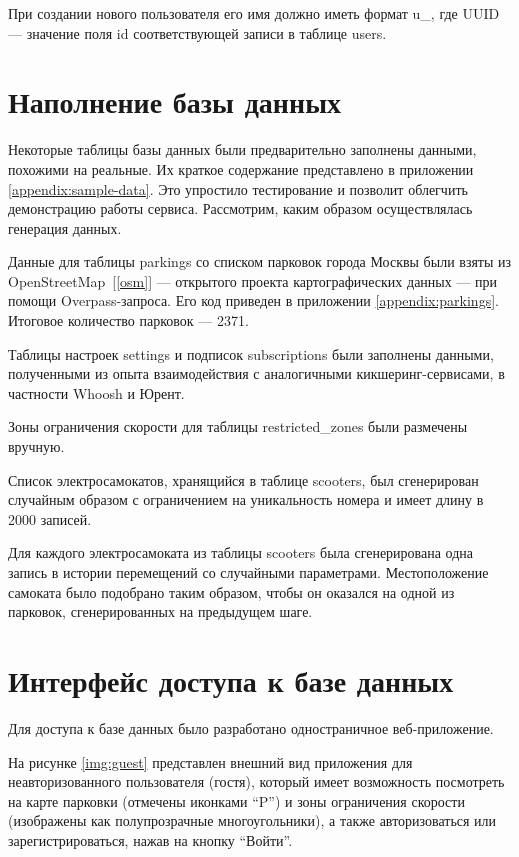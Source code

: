 При создании нового пользователя его имя должно иметь формат u\_<UUID без дефисов>, где UUID --- значение поля id соответствующей записи в таблице users.

\section{Наполнение базы данных}

Некоторые таблицы базы данных были предварительно заполнены данными, похожими на реальные. Их краткое содержание представлено в приложении \ref{appendix:sample-data}. Это упростило тестирование и позволит облегчить демонстрацию работы сервиса. Рассмотрим, каким образом осуществлялась генерация данных.

Данные для таблицы parkings со списком парковок города Москвы были взяты из OpenStreetMap~[\ref{osm}] --- открытого проекта картографических данных --- при помощи Overpass-запроса. Его код приведен в приложении \ref{appendix:parkings}. Итоговое количество парковок --- 2371.

Таблицы настроек settings и подписок subscriptions были заполнены данными, полученными из опыта взаимодействия с аналогичными кикшеринг-сервисами, в частности Whoosh и Юрент.

Зоны ограничения скорости для таблицы restricted\_zones были размечены вручную.

Список электросамокатов, хранящийся в таблице scooters, был сгенерирован случайным образом с ограничением на уникальность номера и имеет длину в 2000 записей.

Для каждого электросамоката из таблицы scooters была сгенерирована одна запись в истории перемещений со случайными параметрами. Местоположение самоката было подобрано таким образом, чтобы он оказался на одной из парковок, сгенерированных на предыдущем шаге.

\section{Интерфейс доступа к базе данных}

Для доступа к базе данных было разработано одностраничное веб-приложение.

На рисунке \ref{img:guest} представлен внешний вид приложения для неавторизованного пользователя (гостя), который имеет возможность посмотреть на карте парковки (отмечены иконками \enquote{P}) и зоны ограничения скорости (изображены как полупрозрачные многоугольники), а также авторизоваться или зарегистрироваться, нажав на кнопку \enquote{Войти}.

